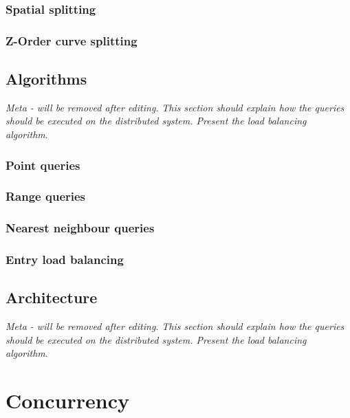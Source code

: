 \documentclass[11pt,a4paper]{globis-book}
\begin{document}
\subsection{Spatial splitting}

\subsection{Z-Order curve splitting}

\section{Algorithms}
\label{sec:distindex-algorithms}

\textit{Meta - will be removed after editing.}
\textit{This section should explain how the queries should be executed on the distributed system. Present the load balancing algorithm}.

\subsection{Point queries}

\subsection{Range queries}

\subsection{Nearest neighbour queries}

\subsection{Entry load balancing}

\section{Architecture}
\label{sec:distindex-architectures}

\textit{Meta - will be removed after editing.}
\textit{This section should explain how the queries should be executed on the distributed system. Present the load balancing algorithm}.

\chapter{Concurrency}
\label{ch:concurrency}
\end{document}
